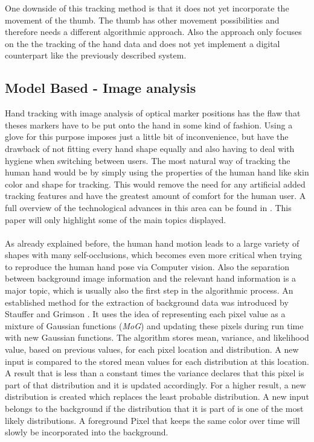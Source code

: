One downside of this tracking method is that it does not yet incorporate the movement of the thumb. The thumb has other movement possibilities and therefore needs a different algorithmic approach. Also the approach only focuses on the the tracking of the hand data and does not yet implement a digital counterpart like the previously described system.
\subsection{Model Based - Image analysis}
Hand tracking with image analysis of optical marker positions has the flaw that theses markers have to be put onto the hand in some kind of fashion. Using a glove for this purpose imposes just a little bit of inconvenience, but have the drawback of not fitting every hand shape equally and also having to deal with hygiene when switching between users. The most natural way of tracking the human hand would be by simply using the properties of the human hand like skin color and shape for tracking. This would remove the need for any artificial added tracking features and have the greatest amount of comfort for the human user.
A full overview of the technological advances in this area can be found in \cite{Moeslund.2006,Moeslund.2001}. This paper will only highlight some of the main topics displayed.\\\\
As already explained before, the human hand motion leads to a large variety of shapes with many self-occlusions, which becomes even more critical when trying to reproduce the human hand pose via Computer vision. Also the separation between background image information and the relevant hand information is a major topic, which is usually also the first step in the algorithmic process.
An established method for the extraction of background data was introduced by Stauffer and Grimson \cite{Stauffer.1999}. It uses the idea of representing each pixel value as a mixture of Gaussian functions (\textit{MoG}) and updating these pixels during run time with new Gaussian functions.
The algorithm stores mean, variance, and likelihood value, based on previous values, for each pixel location and distribution. 
A new input is compared to the stored mean values for each distribution at this location.
A result that is less than a constant times the variance declares that this pixel is part of that distribution and it is updated accordingly. For a higher result, a new distribution is created which replaces the least probable distribution. A new input belongs to the background if the distribution that it is part of is one of the most likely distributions.
A foreground Pixel that keeps the same color over time will slowly be incorporated into the background.

